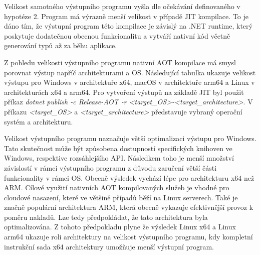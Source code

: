 Velikost samotného výstupního programu vyšla dle očekávání definovaného v hypotéze 2. Program má výrazně menší velikost v případě JIT kompilace. To je dáno tím, že výstupní program této kompilace je závislý na .NET runtime, který poskytuje dodatečnou obecnou funkcionalitu a vytváří nativní kód včetně generování typů až za běhu aplikace.

Z pohledu velikosti výstupního programu nativní AOT kompilace má smysl porovnat výstup napříč architekturami a OS. Následující tabulka ukazuje velikost výstupu pro Windows v architektuře x64, macOS v architektuře arm64 a Linux v architekturách x64 a arm64. Pro vytvoření výstupů na základě JIT byl použit příkaz \emph{dotnet publish -c Release-AOT -r <target\_OS>-<target\_architecture>}. V příkazu \emph{<target\_OS>} a \emph{<target\_architecture>} představuje vybraný operační systém a architekturu.


Velikost výstupního programu naznačuje větší optimalizaci výstupu pro Windows. Tato skutečnost může být způsobena dostupností specifických knihoven ve Windows, respektive rozsáhlejšího API. Následkem toho je menší množství závislostí v rámci výstupního programu z důvodu zaručení větší části funkcionality v rámci OS. Obecně výsledek vychází lépe pro architekturu x64 než ARM. Cílové využití nativních AOT kompilovaných služeb je vhodné pro cloudové nasazení, které ve většině případů běží na Linux serverech. Také je značně populární architektura ARM, která obecně vykazuje efektivnější provoz k poměru nakladů. Lze tedy předpokládat, že tato architektura byla optimalizována. Z tohoto předpokladu plyne že výsledek Linux x64 a Linux arm64 ukazuje roli architektury na velikost výstupního programu, kdy kompletní instrukční sada x64 architektury umožňuje menší výstupní program.

